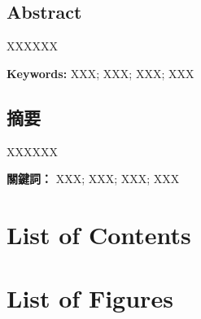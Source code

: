 \documentclass[12pt]{article}
\begin{document}
\begin{CJK*}{UTF8}{bsmi}
\begin{center}
\Large
\section* {Abstract}

\end{center}

XXXXXX



\par
\textbf{Keywords:} XXX; XXX; XXX; XXX



\newpage

\begin{center}
\Large
\section* {摘要}
\end{center}

XXXXXX
\par

\textbf{關鍵詞：} XXX; XXX; XXX; XXX








\section*{List of Contents}
\renewcommand*\contentsname{}
\tableofcontents
{}
\newpage



\section*{List of Figures}
\renewcommand*\listfigurename{}
\listoffigures
{}


\newpage




\end{CJK*}
\end{document}
